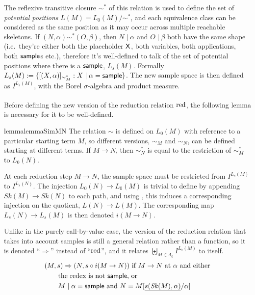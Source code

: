 The reflexive transitive closure $\sim^*$ of this relation is used to define the set of \emph{potential positions} $L(M) = L_0(M) / \sim^*$, and each equivalence class can be considered as the same position as it may occur across multiple reachable skeletons. 
If $(N,\alpha) \sim^* (O,\beta)$, then $N \mid \alpha$ and $O \mid \beta$ both have the same shape (i.e.~they're either both the placeholder $\mathsf{X}$, both variables, both applications, both $\mathsf{sample}$s etc.), therefore it's well-defined to talk of the set of potential positions where there is a $\mathsf{sample}$, $L_s(M)$. 
Formally $L_s(M) := \{[(X, \alpha)]_{\sim^\ast_M} : X \mid \alpha = \mathsf{sample}\}$.
The new sample space is then defined as $I^{L_s(M)}$, with the Borel $\sigma$-algebra and product measure.

\paragraph{}
Before defining the new version of the reduction relation $\operatorname{red}$, the following lemma is necessary for it to be well-defined.

\begin{restatable}{lemma}{lemmaSimMN}
\label{lem:sim-M-N}
The relation $\sim$ is defined on $L_0(M)$ with reference to a particular starting term $M$, so different versions, $\sim_M$ and $\sim_N$, can be defined starting at different terms. If $M \to N$, then $\sim^*_N$ is equal to the restriction of $\sim^*_M$ to $L_0(N)$.
\end{restatable} 


At each reduction step $M \to N$, the sample space must be restricted from $I^{L_s(M)}$ to $I^{L_s(N)}$. 
The injection $L_0(N) \to L_0(M)$ is trivial to define by appending $\mathit{Sk}(M) \to \mathit{Sk}(N)$ to each path, and using , this induces a corresponding injection on the quotient, $L(N) \to L(M)$. 
The corresponding map $L_s(N) \to L_s(M)$ is then denoted $i(M \to N)$.

Unlike in the purely call-by-value case, the version of the reduction relation that takes into account samples is still a general relation rather than a function, so it is denoted ``$\Rightarrow$'' instead of ``$\operatorname{red}$'', and it relates $\biguplus_{M \in \Lambda_0} I^{L_s(M)}$ to itself.
\begin{align*}
& (M,s) \Rightarrow (N,s \circ i(M \to N)) \text{ if $M \to N$ at $\alpha$ and either} \\
& \qquad \text{the redex is not $\mathsf{sample}$, or} \\
& \qquad \text{$M \mid \alpha = \mathsf{sample}$ and $N = M[\underline{s(\mathit{Sk}(M),\alpha)}/\alpha]$}
\end{align*}


